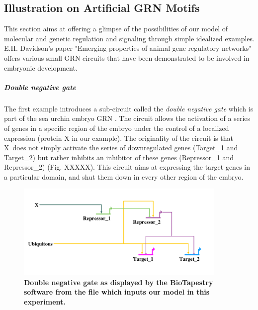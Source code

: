 \subsection{Illustration on Artificial GRN Motifs}


  This section aims at offering a glimpse of the possibilities of our model of molecular and genetic regulation and signaling through simple idealized examples. E.H. Davidson's paper "Emerging properties of animal gene regulatory networks" \cite{Davidson:2010ez} offers various small GRN circuits that have been demonstrated to be involved in embryonic development.  

\subparagraph{Double negative gate}

  The first example introduces a sub-circuit called the \textit{double negative gate} which is part of the sea urchin embryo GRN \cite{Peter:2009dl}\cite{Davidson:2009gx}. The circuit allows the activation of a series of genes in a specific region of the embryo under the control of a localized expression (protein X in our example). The originality of the circuit is that X does not simply activate the series of downregulated genes (Target_1 and Target_2) but rather inhibits an inhibitor of these genes (Repressor_1 and Repressor_2) (Fig. XXXXX). This circuit aims at expressing the target genes in a particular domain, and shut them down in every other region of the embryo. 
\begin{figure}
\begin{center}
\includegraphics[width=0.9\textwidth]{../../images/Cases_Studies/Case_theo_grn/double_negative_gate/dng_grn.png}
\end{center}
\caption{\textbf{Double negative gate as displayed by the BioTapestry software from the file which inputs our model in this experiment.}}
\label{double_negative_gate_dng_grn}
\end{figure}

